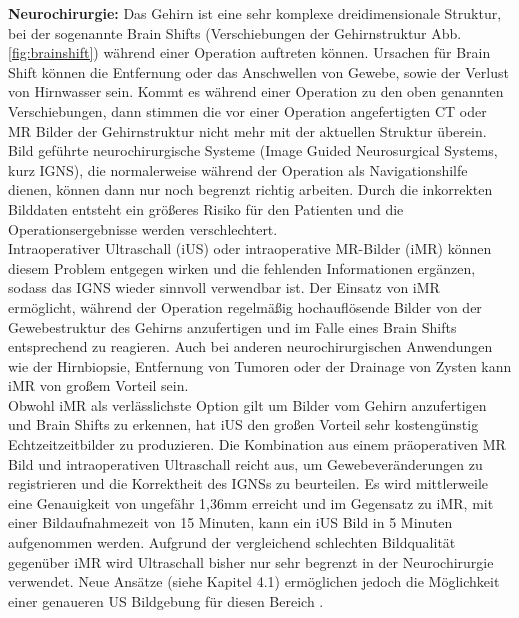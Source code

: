 \textbf{Neurochirurgie:}
Das Gehirn ist eine sehr komplexe dreidimensionale Struktur, bei der sogenannte Brain Shifts (Verschiebungen der Gehirnstruktur Abb. \ref{fig:brainshift}) während einer Operation auftreten können. Ursachen für Brain Shift können die Entfernung oder das Anschwellen von Gewebe, sowie der Verlust von Hirnwasser sein. 
Kommt es während einer Operation zu den oben genannten Verschiebungen, dann stimmen die vor einer Operation angefertigten CT oder MR Bilder der Gehirnstruktur nicht mehr mit der aktuellen Struktur überein. Bild geführte neurochirurgische Systeme (Image Guided Neurosurgical Systems, kurz IGNS), die normalerweise während der Operation als Navigationshilfe dienen, können dann nur noch begrenzt richtig arbeiten. Durch die inkorrekten Bilddaten entsteht ein größeres Risiko für den Patienten und die Operationsergebnisse werden verschlechtert.\\
Intraoperativer Ultraschall (iUS) oder intraoperative MR-Bilder (iMR) können diesem Problem entgegen wirken und die fehlenden Informationen ergänzen, sodass das IGNS wieder sinnvoll verwendbar ist.
Der Einsatz von iMR ermöglicht, während der Operation regelmäßig hochauflösende Bilder von der Gewebestruktur des Gehirns anzufertigen und im Falle eines Brain Shifts entsprechend zu reagieren. Auch bei anderen neurochirurgischen Anwendungen wie der Hirnbiopsie, Entfernung von Tumoren oder der Drainage von Zysten kann iMR von großem Vorteil sein.\\
Obwohl iMR als verlässlichste Option gilt um Bilder vom Gehirn anzufertigen und Brain Shifts zu erkennen, hat iUS den großen Vorteil sehr kostengünstig Echtzeitzeitbilder zu produzieren. Die Kombination aus einem präoperativen MR Bild und intraoperativen Ultraschall reicht aus, um Gewebeveränderungen zu registrieren und die Korrektheit des IGNSs zu beurteilen. Es wird mittlerweile eine Genauigkeit von ungefähr 1,36mm erreicht und im Gegensatz zu iMR, mit einer Bildaufnahmezeit von 15 Minuten, kann ein iUS Bild in 5 Minuten aufgenommen werden.
Aufgrund der vergleichend schlechten Bildqualität gegenüber iMR wird Ultraschall bisher nur sehr begrenzt in der Neurochirurgie verwendet. Neue Ansätze (siehe Kapitel 4.1) ermöglichen jedoch die Möglichkeit einer genaueren US Bildgebung für diesen Bereich \cite{BrainShiftInTumorResection}.

